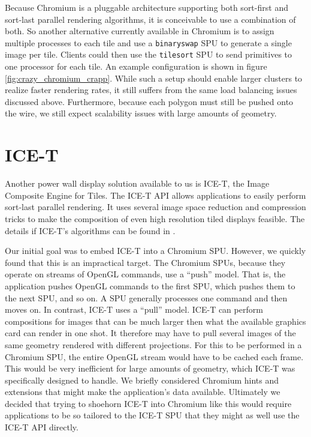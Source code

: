 \documentclass[twocolumn]{article}
\newcommand{\cidentifier}[1]{\texttt{#1}}
\begin{document}
  Because Chromium is a pluggable architecture supporting both sort-first
  and sort-last parallel rendering algorithms, it is conceivable to use a
  combination of both.  So another alternative currently available in
  Chromium is to assign multiple processes to each tile and use a
  \cidentifier{binary\-swap} SPU to generate a single image per tile.
  Clients could then use the \cidentifier{tile\-sort} SPU to send
  primitives to one processor for each tile.  An example configuration is
  shown in figure \vref{fig:crazy_chromium_crapp}.  While such a setup
  should enable larger clusters to realize faster rendering rates, it still
  suffers from the same load balancing issues discussed above.
  Furthermore, because each polygon must still be pushed onto the wire, we
  still expect scalability issues with large amounts of geometry.


  \section{ICE-T}
  \label{sec:ICE-T}

  Another power wall display solution available to us is ICE-T, the Image
  Composite Engine for Tiles.  The ICE-T API allows applications to easily
  perform sort-last parallel rendering.  It uses several image space
  reduction and compression tricks to make the composition of even high
  resolution tiled displays feasible.  The details if ICE-T's algorithms
  can be found in \cite{Moreland01}.

  Our initial goal was to embed ICE-T into a Chromium SPU.  However, we
  quickly found that this is an impractical target.  The Chromium SPUs,
  because they operate on streams of OpenGL commands, use a ``push'' model.
  That is, the application pushes OpenGL commands to the first SPU, which
  pushes them to the next SPU, and so on.  A SPU generally processes one
  command and then moves on.  In contrast, ICE-T uses a ``pull'' model.
  ICE-T can perform compositions for images that can be much larger then
  what the available graphics card can render in one shot.  It therefore
  may have to pull several images of the same geometry rendered with
  different projections.  For this to be performed in a Chromium SPU, the
  entire OpenGL stream would have to be cached each frame.  This would be
  very inefficient for large amounts of geometry, which ICE-T was
  specifically designed to handle.  We briefly considered Chromium hints
  and extensions that might make the application's data available.
  Ultimately we decided that trying to shoehorn ICE-T into Chromium like
  this would require applications to be so tailored to the ICE-T SPU that
  they might as well use the ICE-T API directly.
\end{document}
